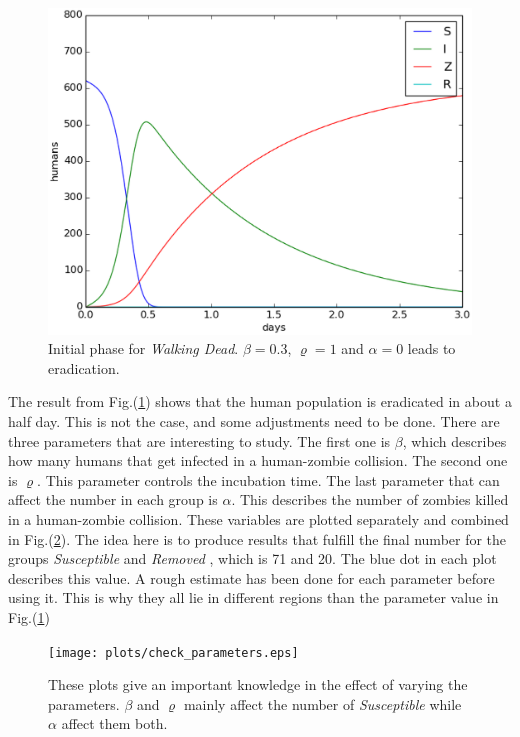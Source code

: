 \documentclass[%
twoside,                 %
final,                   %
10pt]{article}
\begin{document}
\begin{figure}[ht]
  \centerline{\includegraphics[width=0.9\linewidth]{plots/WD_zombie_initial_1.eps}}
  \caption{
  \label{fig:initial_phase_1} Initial phase for \emph{Walking Dead}. $\beta=0.3$, $\varrho=1$ and $\alpha=0$ leads to eradication.
  }
\end{figure}


The result from Fig.(\ref{fig:initial_phase_1}) shows that the human population is eradicated in about a half day. This is not the case, and some adjustments need to be done. There are three parameters that are interesting to study. The first one is $\beta$, which describes how many humans that get infected in a human-zombie collision. The second one is $\varrho$. This parameter controls the incubation time. The last parameter that can affect the number in each group is $\alpha$. This describes the number of zombies killed in a human-zombie collision. These variables are plotted separately and combined in Fig.(\ref{fig:initial_parameters}). The idea here is to produce results that fulfill the final number for the groups \emph{Susceptible} and \emph{Removed} , which is 71 and 20. The blue dot in each plot describes this value. A rough estimate has been done for each parameter before using it. This is why they all lie in different regions than the parameter value in Fig.(\ref{fig:initial_phase_1})



\begin{figure}[ht]
  \centerline{\texttt{[image: plots/check\_parameters.eps]}}
  \caption{
  \label{fig:initial_parameters} These plots give an important knowledge in the effect of varying the parameters. $\beta$ and $\varrho$ mainly affect the number of \emph{Susceptible} while $\alpha$ affect them both.
  }
\end{figure}
\end{document}

